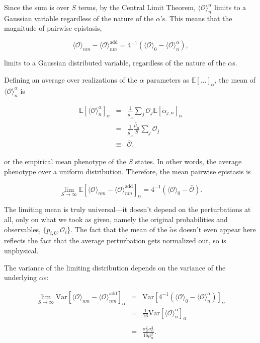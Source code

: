 \documentclass[12pt]{article}
\def\be{\begin{equation}}
\def\ee{\end{equation}}
\def\bea{\begin{eqnarray}}
\def\eea{\end{eqnarray}}
\def\expec{\mathbb{E}}
\def\Var{\text{Var}}
\def\O{\mathcal{O}}
\begin{document}
\noindent Since the sum is over $S$ terms, by the Central Limit Theorem, $\langle \O \rangle^{\alpha}_n $ limits to a Gaussian variable regardless of the nature of the $\alpha$'s.  This means that the magnitude of pairwise epistasis,

\be
\langle \O \rangle_{nm} - \langle \O \rangle^{\text{add}}_{nm} = 4^{-1}\left(\langle \O \rangle_{0} - \langle \O \rangle_n^{\alpha}\right),
\ee

\noindent limits to a Gaussian distributed variable, regardless of the nature of the $\alpha$s.

Defining an average over realizations of the $\alpha$ parameters as $\expec[...]_{\alpha}$, the mean of $\langle \O \rangle_n^{\alpha}$ is

\bea
\expec[\langle \O \rangle^{\alpha}_n]_{\alpha} &=&   \frac{1}{\tilde{\mu_{\alpha}}}\sum_j \O_j\expec[ \tilde{\alpha}_{j,n}]_{\alpha}\nonumber\\
&=& \frac{1}{\tilde{\mu_{\alpha}}}\frac{\tilde{\mu_{\alpha}}}{S}\sum_j \O_j\nonumber\\
&\equiv& \bar{\O},
\eea

\noindent or the empirical mean phenotype of the $S$ states.  In other words, the average phenotype over a uniform distribution.  Therefore, the mean pairwise epistasis is

\be
\lim_{S\to\infty}\expec\left[\langle \O \rangle_{nm} - \langle \O \rangle^{\text{add}}_{nm}\right]_{\alpha} = 4^{-1}\left(\langle \O \rangle_{0} - \bar{\O }\right).
\ee

\noindent The limiting mean is truly universal---it doesn't depend on the perturbations at all, only on what we took as given, namely the original probabilities and observables, $\{p_{i,0},\O_{i}\}$.  The fact that the mean of the $\tilde{\alpha}$s doesn't even appear here reflects the fact that the average perturbation gets normalized out, so is unphysical.

The variance of the limiting distribution depends on the variance of the underlying $\alpha$s:

\bea
\lim_{S\to\infty}\Var\left[\langle \O \rangle_{nm} - \langle \O \rangle^{\text{add}}_{nm}\right]_{\alpha} &=& \Var\left[4^{-1}\left(\langle \O \rangle_{0} - \langle \O \rangle_n^{\alpha}\right)\right]_{\alpha}\nonumber\\
&=& \frac{1}{16}\Var\left[\langle \O \rangle_n^{\alpha}\right]_{\alpha}\nonumber\\
&&\nonumber\\
&=& \frac{\sigma^2_{\O}\sigma^2_{\alpha}}{16\mu^2_{\alpha}}.
\eea
 
\end{document}
